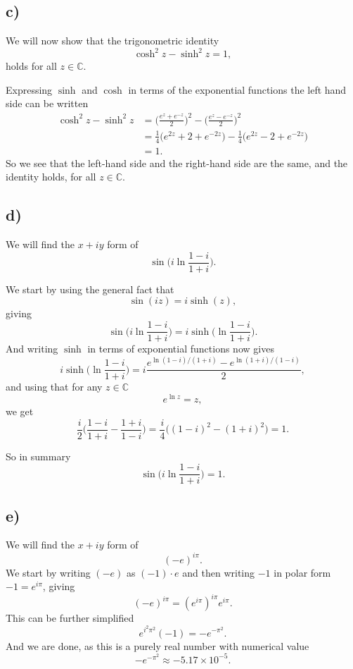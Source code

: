 \documentclass[a4paper, 11pt, titlepage, english]{article}
\begin{document}
\clearpage

\subsection*{c)}
We will now show that the trigonometric identity
$$\cosh^2 z - \sinh^2 z = 1,$$
holds for all $z \in \mathbb{C}$.

Expressing $\sinh$ and $\cosh$ in terms of the exponential functions the left hand side can be written
\begin{align*}
\cosh^2 z - \sinh^2 z &= \bigg(\frac{e^z + e^{-z}}{2}\bigg)^2 - \bigg( \frac{e^z-e^{-z}}{2} \bigg)^2 \\[0.2cm]
&=  \frac{1}{4}\bigg(e^{2z} + 2 + e^{-2z}\bigg) - \frac{1}{4}\bigg(e^{2z} - 2 + e^{-2z}\bigg) \\[0.2cm]
&= 1.
\end{align*}
So we see that the left-hand side and the right-hand side are the same, and the identity holds, for all $z\in\mathbb{C}$.

\subsection*{d)}
We will find the $x+iy$ form of 
$$\sin\bigg( i \ln \frac{1-i}{1+i} \bigg).$$

We start by using the general fact that
$$\sin(iz) = i\sinh(z),$$
giving
$$\sin\bigg( i \ln \frac{1-i}{1+i} \bigg) = i\sinh\bigg(\ln \frac{1-i}{1+i} \bigg).$$
And writing $\sinh$ in terms of exponential functions now gives
$$i\sinh\bigg(\ln \frac{1-i}{1+i} \bigg) = i \frac{e^{\ln (1-i)/(1+i)} - e^{\ln (1+i)/(1-i)}}{2},$$
and using that for any $z \in \mathbb{C}$
$$e^{\ln z} = z,$$
we get
$$\frac{i}{2}\bigg(\frac{1-i}{1+i} - \frac{1+i}{1-i}\bigg) = \frac{i}{4}\bigg((1-i)^2 - (1+i)^2\bigg) = 1.$$

So in summary
$$\sin\bigg( i \ln \frac{1-i}{1+i} \bigg) = 1.$$

\subsection*{e)}
We will find the $x+iy$ form of
$$(-e)^{i\pi}.$$
We start by writing $(-e)$ as $(-1)\cdot e$ and then writing $-1$ in polar form $-1 = e^{i\pi}$, giving
$$(-e)^{i\pi} = (e^{i\pi})^{i\pi}e^{i\pi}.$$
This can be further simplified
$$e^{i^2\pi^2}(-1) = -e^{-\pi^2}.$$
And we are done, as this is a purely real number with numerical value
$$-e^{-\pi^2} \approx -5.17\times10^{-5}.$$
\end{document}
